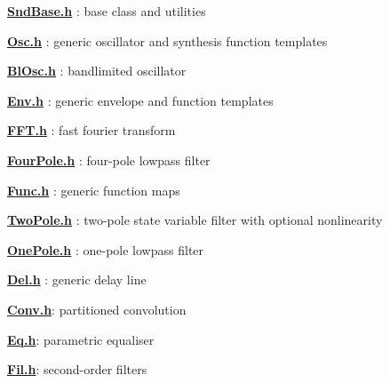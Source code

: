 {\bfseries \hyperlink{_snd_base_8h}{Snd\+Base.\+h}} \+: base class and utilities

{\bfseries \hyperlink{_osc_8h}{Osc.\+h}} \+: generic oscillator and synthesis function templates

{\bfseries \hyperlink{_bl_osc_8h}{Bl\+Osc.\+h}} \+: bandlimited oscillator

{\bfseries \hyperlink{_env_8h}{Env.\+h}} \+: generic envelope and function templates

{\bfseries \hyperlink{_f_f_t_8h}{F\+F\+T.\+h}} \+: fast fourier transform

{\bfseries \hyperlink{_four_pole_8h}{Four\+Pole.\+h}} \+: four-\/pole lowpass filter

{\bfseries \hyperlink{_func_8h}{Func.\+h}} \+: generic function maps

{\bfseries \hyperlink{_two_pole_8h}{Two\+Pole.\+h}} \+: two-\/pole state variable filter with optional nonlinearity

{\bfseries \hyperlink{_one_pole_8h}{One\+Pole.\+h}} \+: one-\/pole lowpass filter

{\bfseries \hyperlink{_del_8h}{Del.\+h}} \+: generic delay line

{\bfseries \hyperlink{_conv_8h}{Conv.\+h}}\+: partitioned convolution

{\bfseries \hyperlink{_eq_8h}{Eq.\+h}}\+: parametric equaliser

{\bfseries \hyperlink{_fil_8h}{Fil.\+h}}\+: second-\/order filters 